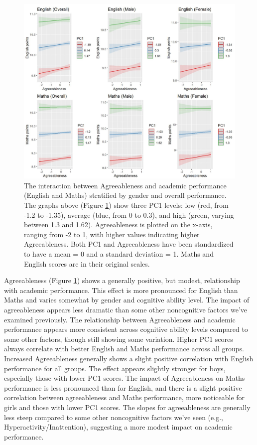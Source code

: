 \documentclass[12pt,a4paper,onecolumn]{article}
\numberwithin{equation}{section}
\begin{document}
\begin{figure}[ht] 
    \centering
    \includegraphics[width=1\linewidth]{AVE_TIPI_Agree.JPG}
    \caption{The interaction between Agreeableness and academic performance (English and Maths) stratified by gender and overall performance. The graphs above (Figure \ref{Fig5}) show three PC1 levels: low (red, from -1.2 to -1.35), average (blue, from 0 to 0.3), and high (green, varying between 1.3 and 1.62). Agreeableness is plotted on the x-axis, ranging from -2 to 1, with higher values indicating higher Agreeableness. Both PC1 and Agreeableness have been standardized to have a mean = 0 and a standard deviation = 1. Maths and English scores are in their original scales.
}
    \label{Fig5}
\end{figure}

Agreeableness (Figure \ref{Fig5}) shows a generally positive, but modest, relationship with academic performance. This effect is more pronounced for English than Maths and varies somewhat by gender and cognitive ability level. The impact of agreeableness appears less dramatic than some other noncognitive factors we've examined previously. The relationship between Agreeableness and academic performance appears more consistent across cognitive ability levels compared to some other factors, though still showing some variation. Higher PC1 scores always correlate with better English and Maths performance across all groups. Increased Agreeableness generally shows a slight positive correlation with English performance for all groups. The effect appears slightly stronger for boys, especially those with lower PC1 scores. The impact of Agreeableness on Maths performance is less pronounced than for English, and there is a slight positive correlation between agreeableness and Maths performance, more noticeable for girls and those with lower PC1 scores. The slopes for agreeableness are generally less steep compared to some other noncognitive factors we've seen (e.g., Hyperactivity/Inattention), suggesting a more modest impact on academic performance.
\end{document}
